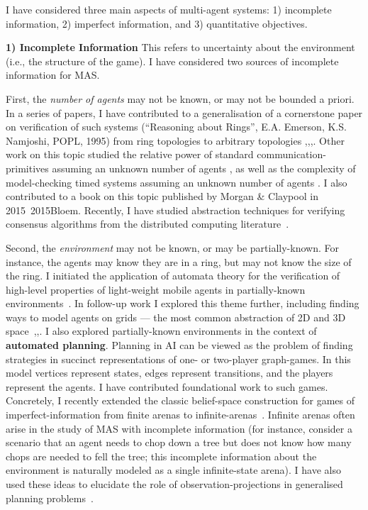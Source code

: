 \documentclass[a4paper,10pt]{scrartcl}
\begin{document}
I have considered three main aspects of multi-agent systems: 1) {incomplete information}, 2) {imperfect information}, and 3) {quantitative objectives}.
 
 \textbf{1) Incomplete Information} This refers to uncertainty about the environment (i.e., the structure of the game). I have considered two sources of incomplete information for MAS.
 


First, the \emph{number of agents} may not be known, or may not be bounded a priori.
In a series of papers, I have contributed to a generalisation of a cornerstone paper on verification of such systems (``Reasoning about Rings'', E.A. Emerson, K.S. Namjoshi, 
\textsc{POPL}, 1995) from ring topologies to arbitrary topologies ,,,. Other work on this topic 
studied the relative power of standard communication-primitives assuming an unknown number of agents , 
as well as the complexity of model-checking timed systems assuming an unknown number of agents . 
I also contributed to a book on this topic published by Morgan \& Claypool in 2015~\DBLPseriessynthesis2015Bloem. %
Recently, I have studied abstraction techniques for verifying consensus algorithms from the distributed computing literature~. 
 



Second, the \emph{environment} may not be known, or may be partially-known. For instance, the agents may know they are in a ring, but may not know the size of the ring. I initiated the application of automata theory for the verification of high-level properties of light-weight mobile agents in partially-known environments~. 
In follow-up work I explored this theme further, including finding ways to model agents on grids --- the most common abstraction of 2D and 3D space~,,. I also explored partially-known environments in the context of \textbf{automated planning}. Planning in AI can be viewed as the problem of finding strategies in succinct representations of one- or two-player graph-games. In this model vertices represent states, edges represent transitions, and the players represent the agents. I have contributed foundational work to such games. Concretely, I recently extended the classic belief-space construction for games of imperfect-information from finite arenas to infinite-arenas~. Infinite arenas often arise in the study of MAS with incomplete information (for instance, consider a scenario that an agent needs to chop down a tree but does not know how many chops are needed to fell the tree; this incomplete information about the environment is naturally modeled as a single infinite-state arena). I have also used these ideas to elucidate the role of observation-projections in generalised planning problems~.
 
\end{document}
